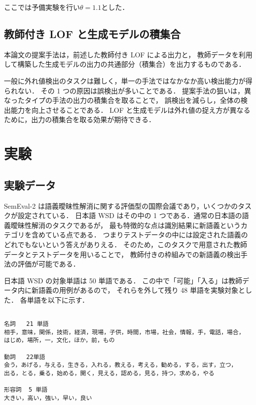 \documentclass[japanese]{jnlp_1.4}
\begin{document}
ここでは予備実験を行い\( \theta = 1.1 \)とした．


\subsection{教師付き LOF と生成モデルの積集合}

本論文の提案手法は，前述した教師付き LOF による出力と，
教師データを利用して構築した生成モデルの出力の共通部分（積集合）を出力するものである．

一般に外れ値検出のタスクは難しく，単一の手法ではなかなか高い検出能力が得られない．
その 1 つの原因は誤検出が多いことである．
提案手法の狙いは，異なったタイプの手法の出力の積集合を取ることで，
誤検出を減らし，全体の検出能力を向上させることである．
LOF と生成モデルは外れ値の捉え方が異なるために，出力の積集合を取る効果が期待できる．



\section{実験}

\subsection{実験データ}

SemEval-2 は語義曖昧性解消に関する評価型の国際会議であり，いくつかのタスクが設定されている．
日本語 WSD はその中の 1 つである．通常の日本語の語義曖昧性解消のタスクであるが，
最も特徴的な点は識別結果に新語義というカテゴリを含めている点である．
つまりテストデータの中には設定された語義のどれでもないという答えがありえる．
そのため，このタスクで用意された教師データとテストデータを用いることで，
教師付きの枠組みでの新語義の検出手法の評価が可能である．

日本語 WSD の対象単語は 50 単語である．
この中で「可能」「入る」は教師データ内に新語義の用例があるので，
それらを外して残り 48 単語を実験対象とした．
各単語を以下に示す．

\vspace{1\Cvs}

\small
\begin{boxedminipage}{140mm}
\begin{verbatim}

名詞   21 単語
相手，意味，関係，技術，経済，現場，子供，時間，市場，社会，情報，手，電話，場合，
はじめ，場所，一，文化，ほか，前，もの

動詞   22単語
会う，あげる，与える，生きる，入れる，教える，考える，勧める，する，出す，立つ，
出る，とる，乗る，始める，開く，見える，認める，見る，持つ，求める，やる

形容詞  5 単語
大きい，高い，強い，早い，良い

\end{verbatim}
\end{boxedminipage}
\normalsize
\end{document}
